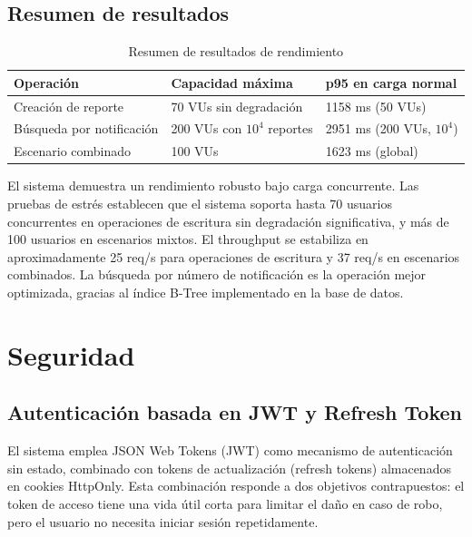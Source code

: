 \documentclass[12pt,letterpaper]{article}
\begin{document}
\subsection{Resumen de resultados}

\begin{table}[H]
\centering
\caption{Resumen de resultados de rendimiento}
\label{tab:resumen-rendimiento}
\begin{tabular}{|l|l|l|}
\hline
\textbf{Operación} & \textbf{Capacidad máxima} & \textbf{p95 en carga normal} \\ \hline
Creación de reporte & 70 VUs sin degradación & 1158 ms (50 VUs) \\ \hline
Búsqueda por notificación & 200 VUs con $10^4$ reportes & 2951 ms (200 VUs, $10^4$) \\ \hline
Escenario combinado & 100 VUs & 1623 ms (global) \\ \hline
\end{tabular}
\end{table}

El sistema demuestra un rendimiento robusto bajo carga concurrente. Las pruebas de estrés establecen que el sistema soporta hasta 70 usuarios concurrentes en operaciones de escritura sin degradación significativa, y más de 100 usuarios en escenarios mixtos. El throughput se estabiliza en aproximadamente 25 req/s para operaciones de escritura y 37 req/s en escenarios combinados. La búsqueda por número de notificación es la operación mejor optimizada, gracias al índice B-Tree implementado en la base de datos.
















	\section{Seguridad}

\subsection{Autenticación basada en JWT y Refresh Token}

El sistema emplea JSON Web Tokens (JWT) como mecanismo de autenticación sin estado, combinado con tokens de actualización (refresh tokens) almacenados en cookies HttpOnly. Esta combinación responde a dos objetivos contrapuestos: el token de acceso tiene una vida útil corta para limitar el daño en caso de robo, pero el usuario no necesita iniciar sesión repetidamente.
\end{document}
